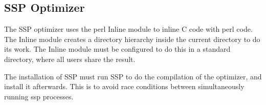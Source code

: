 \documentclass[12pt]{article}
\begin{document}
\subsection{SSP Optimizer}

The SSP optimizer uses the perl Inline module to inline C code with
perl code.  The Inline module creates a directory hierarchy inside the
current directory to do its work.  The Inline module must be
configured to do this in a standard directory, where all users share
the result.

The installation of SSP must run SSP to do the compilation of the
optimizer, and install it afterwards.  This is to avoid race
conditions between simultaneously running ssp processes.
\end{document}

